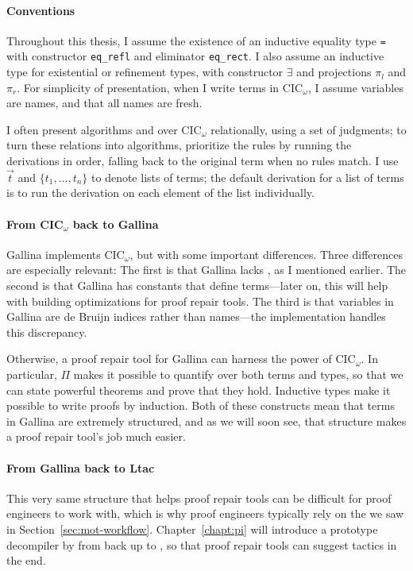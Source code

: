 \paragraph{Conventions}
Throughout this thesis, I assume the existence of an inductive  equality type \lstinline{=} with constructor \lstinline{eq_refl}
and eliminator \lstinline{eq_rect}.
I also assume an inductive type \intro{$\Sigma$} for existential or refinement types,
with constructor $\exists$ and projections $\pi_l$ and $\pi_r$.
For simplicity of presentation, when I write terms in CIC$_{\omega}$, I assume variables are names, and that all names are fresh.

I often present  algorithms and  over CIC$_{\omega}$ relationally, using a set of judgments; %
to turn these relations into algorithms, prioritize the rules by running the derivations in
order, falling back to the original term when no rules match.
I use $\vec{t}$ and $\{t_1, \ldots, t_n\}$ to denote lists of terms;
the default derivation for a list of terms is to run the derivation on each element of the list individually. 

\paragraph{From CIC$_{\omega}$ back to Gallina}
Gallina implements CIC$_{\omega}$, but with some important differences.
Three differences are especially relevant:
The first is that Gallina lacks , as I mentioned earlier.
The second is that Gallina has constants that define terms---later on, this will help with building optimizations for proof repair tools.
The third is that variables in Gallina are de Bruijn indices rather than names---the implementation handles this discrepancy.

Otherwise, a proof repair tool for Gallina can harness the power of CIC$_{\omega}$.
In particular, $\Pi$ makes it possible to quantify over both terms and types,
so that we can state powerful theorems and prove that they hold.
Inductive types make it possible to write proofs by induction.
Both of these constructs mean that terms in Gallina are extremely structured,
and as we will soon see, that structure makes a proof repair tool's job much easier.

\paragraph{From Gallina back to Ltac}
This very same structure that helps proof repair tools can be difficult for proof engineers to work with,
which is why proof engineers typically rely on the   we saw in Section~\ref{sec:mot-workflow}.
Chapter~\ref{chapt:pi} will introduce a prototype decompiler by  from  back up to ,
so that proof repair tools can suggest tactics in the end.

